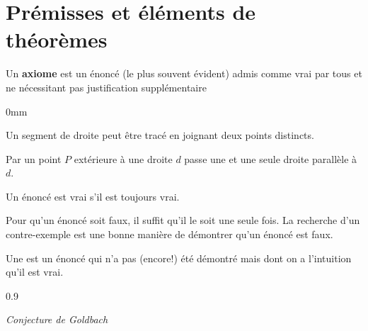 \setcounter{section}{-1}

\section{Prémisses et éléments de théorèmes}


\begin{definition}
Un \textbf{axiome} est un énoncé (le plus souvent évident) admis comme vrai par tous et ne nécessitant pas justification supplémentaire 
\end{definition}


\smallskip
\begin{exemples}{0mm}
\item Un segment de droite peut être tracé en joignant deux points distincts.
\item Par un point $P$ extérieure à une droite $d$ passe une et une seule droite parallèle à $d$.
\end{exemples}


\medskip
\begin{remarques}
\item Un énoncé est vrai s'il est toujours vrai.
\item Pour qu'un énoncé soit faux, il suffit qu'il le soit une seule fois. La recherche d'un contre-exemple est une bonne manière de démontrer qu'un énoncé est faux.
\end{remarques}


\smallskip
\begin{definition}
Une  est un énoncé qui n'a pas (encore!) été démontré mais dont on a l'intuition qu'il est vrai.
\end{definition}

\smallskip
\begin{exemple}{0.9}\vspace{-3mm}

\small
\hfill \textit{Conjecture de Goldbach}
\end{exemple}

